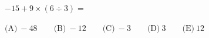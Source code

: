 $-15+9\times (6\div 3) =$



$\text{(A)}\ -48 \qquad \text{(B)}\ -12 \qquad \text{(C)}\ -3 \qquad \text{(D)}\ 3 \qquad \text{(E)}\ 12$
